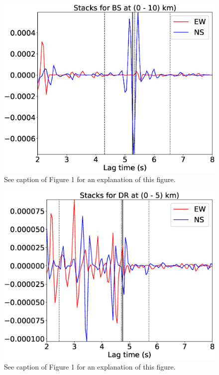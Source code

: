 \documentclass[letterpaper, 12pt]{article}
\begin{document}
\begin{figure}[H]
\includegraphics[width=\linewidth]{figures/intervals/BS_000_010_stacks.eps}
\caption{See caption of Figure 1 for an explanation of this figure.}
\end{figure}

\begin{figure}[H]
\includegraphics[width=\linewidth]{figures/intervals/DR_000_005_stacks.eps}
\caption{See caption of Figure 1 for an explanation of this figure.}
\end{figure}
\end{document}
